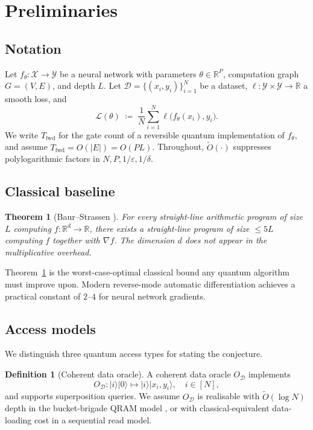 \documentclass[11pt,a4paper]{article}
\newtheorem{theorem}{Theorem}
\theoremstyle{definition}
\newtheorem{definition}{Definition}
\newcommand{\Otil}{\widetilde{O}}
\newcommand{\R}{\mathbb{R}}
\newcommand{\veps}{\varepsilon}
\newcommand{\loss}{\mathcal{L}}
\newcommand{\Dset}{\mathcal{D}}
\begin{document}
\section{Preliminaries}\label{sec:prelim}

\subsection{Notation}

Let $f_\theta : \mathcal{X} \to \mathcal{Y}$ be a neural network with parameters $\theta \in \R^P$, computation graph $G=(V,E)$, and depth $L$. Let $\Dset = \{(x_i, y_i)\}_{i=1}^N$ be a dataset, $\ell : \mathcal{Y}\times\mathcal{Y} \to \R$ a smooth loss, and
\begin{equation}
\loss(\theta) \;\coloneqq\; \frac{1}{N}\sum_{i=1}^N \ell\bigl(f_\theta(x_i), y_i\bigr).
\end{equation}
We write $T_{\text{fwd}}$ for the gate count of a reversible quantum implementation of $f_\theta$, and assume $T_{\text{fwd}} = O(|E|) = O(PL)$. Throughout, $\Otil(\cdot)$ suppresses polylogarithmic factors in $N, P, 1/\veps, 1/\delta$.

\subsection{Classical baseline}

\begin{theorem}[Baur--Strassen \cite{BaurStrassen1983}]\label{thm:baur-strassen}
For every straight-line arithmetic program of size $L$ computing $f : \R^d \to \R$, there exists a straight-line program of size $\le 5L$ computing $f$ together with $\nabla f$. The dimension $d$ does not appear in the multiplicative overhead.
\end{theorem}

Theorem~\ref{thm:baur-strassen} is the worst-case-optimal classical bound any quantum algorithm must improve upon. Modern reverse-mode automatic differentiation \cite{GriewankWalther2008} achieves a practical constant of $2$--$4$ for neural network gradients.

\subsection{Access models}

We distinguish three quantum access types for stating the conjecture.

\begin{definition}[Coherent data oracle]
\label{def:data-oracle}
A coherent data oracle $O_\Dset$ implements
\[
O_\Dset : |i\rangle|0\rangle \mapsto |i\rangle|x_i, y_i\rangle,\quad i \in [N],
\]
and supports superposition queries. We assume $O_\Dset$ is realisable with $\Otil(\log N)$ depth in the bucket-brigade QRAM model \cite{GLM2008}, or with classical-equivalent data-loading cost in a sequential read model.
\end{definition}
\end{document}
